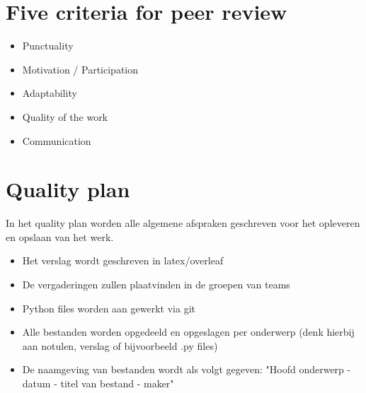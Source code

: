 \documentclass{article}
\begin{document}
\section*{Five criteria for peer review}
    \begin{itemize}
       \item Punctuality
       \item Motivation / Participation
        \item Adaptability
        \item Quality of the work 
        \item Communication
    \end{itemize}



\section*{Quality plan}
In het quality plan worden alle algemene afspraken geschreven voor het opleveren en opslaan van het werk.

\begin{itemize}
    \item Het verslag wordt geschreven in latex/overleaf
    \item De vergaderingen zullen plaatvinden in de groepen van teams
    \item Python files worden aan gewerkt via git
    \item Alle bestanden worden opgedeeld en opgeslagen per onderwerp (denk hierbij aan notulen, verslag of bijvoorbeeld .py files)
    \item De naamgeving van bestanden wordt als volgt gegeven: "Hoofd onderwerp - datum - titel van bestand - maker"

\end{itemize}
\end{document}

